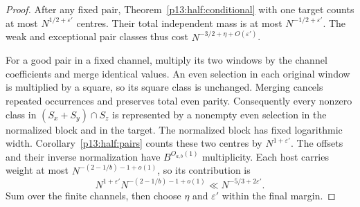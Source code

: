 \begin{proof}
After any fixed pair, Theorem~\ref{p13:half:conditional}
with one target counts at most \(N^{1/2+\varepsilon'}\)
centres. Their total independent mass is at most
\(N^{-1/2+\varepsilon'}\).
The weak and exceptional pair classes thus cost
\(N^{-3/2+\eta+O(\varepsilon')}\).

For a good pair in a fixed channel, multiply its two
windows by the channel coefficients and merge identical
values. An even selection in each original window is
multiplied by a square, so its square class is unchanged.
Merging cancels repeated occurrences and preserves total
even parity. Consequently every nonzero class in
\((S_x+S_y)\cap S_z\) is represented by a nonempty even
selection in the normalized block and in the target.
The normalized block has fixed logarithmic width.
Corollary~\ref{p13:half:pairs} counts these two centres
by \(N^{1+\varepsilon'}\).
The offsets and their inverse normalization have
\(B^{O_{a,b}(1)}\) multiplicity. Each host carries weight
at most \(N^{-(2-1/b)-1+o(1)}\), so its contribution is
\[
 N^{1+\varepsilon'}N^{-(2-1/b)-1+o(1)}
 \ll N^{-5/3+2\varepsilon'}.
\]
Sum over the finite channels, then choose \(\eta\) and
\(\varepsilon'\) within the final margin.
\end{proof}
